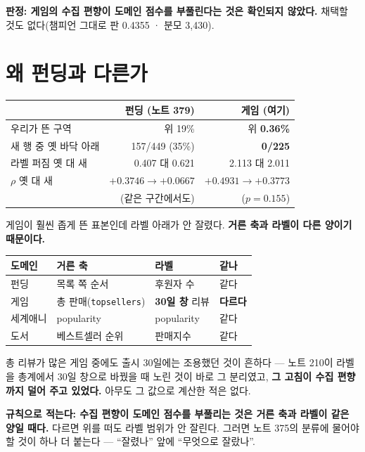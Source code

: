 \documentclass[11pt]{article}
\begin{document}
\textbf{판정: 게임의 수집 편향이 도메인 점수를 부풀린다는 것은 확인되지
않았다.} 채택할 것도 없다(챔피언 그대로 판 0.4355 · 분모 3,430).

\section{왜 펀딩과 다른가}

\begin{center}
\begin{tabular}{lrr}
\hline
 & 펀딩 (노트 379) & 게임 (여기) \\
\hline
우리가 뜬 구역 & 위 19\% & 위 \textbf{0.36\%} \\
새 행 중 옛 바닥 아래 & 157/449 (35\%) & \textbf{0/225} \\
라벨 퍼짐 옛 대 새 & 0.407 대 0.621 & 2.113 대 2.011 \\
$\rho$ 옛 대 새 & $+0.3746 \to +0.0667$ & $+0.4931 \to +0.3773$ \\
 & (같은 구간에서도) & ($p=0.155$) \\
\hline
\end{tabular}
\end{center}

게임이 훨씬 좁게 뜬 표본인데 라벨 아래가 안 잘렸다. \textbf{거른 축과
라벨이 다른 양이기 때문이다.}

\begin{center}
\begin{tabular}{llll}
\hline
도메인 & 거른 축 & 라벨 & 같나 \\
\hline
펀딩 & 목록 쪽 순서 & 후원자 수 & 같다 \\
게임 & 총 판매(\texttt{topsellers}) & \textbf{30일 창} 리뷰 & \textbf{다르다} \\
세계애니 & popularity & popularity & 같다 \\
도서 & 베스트셀러 순위 & 판매지수 & 같다 \\
\hline
\end{tabular}
\end{center}

총 리뷰가 많은 게임 중에도 출시 30일에는 조용했던 것이 흔하다 --- 노트
210이 라벨을 총계에서 30일 창으로 바꿨을 때 노린 것이 바로 그 분리였고,
\textbf{그 고침이 수집 편향까지 덜어 주고 있었다.} 아무도 그 값으로
계산한 적은 없다.

\textbf{규칙으로 적는다: 수집 편향이 도메인 점수를 부풀리는 것은 거른
축과 라벨이 같은 양일 때다.} 다르면 위를 떠도 라벨 범위가 안 잘린다.
그러면 노트 375의 분류에 물어야 할 것이 하나 더 붙는다 --- ``잘렸나''
앞에 ``무엇으로 잘랐나''.
\end{document}
